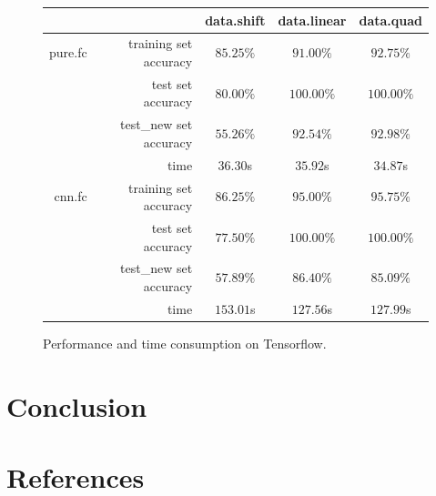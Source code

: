 \documentclass[a4paper]{article}
\begin{document}
\begin{figure}[H]
\centering
\begin{tabular}{|r|r|c|c|c|}
\hline
 & & data.shift & data.linear & data.quad \\
\hline
pure.fc & training set accuracy & $85.25\%$ & $91.00\%$ & $92.75\%$ \\
 & test set accuracy & $80.00\%$ & $100.00\%$ & $100.00\%$ \\
 & test\_new set accuracy & $55.26\%$ & $92.54\%$ & $92.98\%$ \\
 & time & $36.30$s & $35.92$s & $34.87$s \\
\hline
cnn.fc & training set accuracy & $86.25\%$ & $95.00\%$ & $95.75\%$ \\
 & test set accuracy & $77.50\%$ & $100.00\%$ & $100.00\%$ \\
 & test\_new set accuracy & $57.89\%$ & $86.40\%$ & $85.09\%$ \\
 & time & $153.01$s & $127.56$s & $127.99$s \\
\hline
\end{tabular}
\caption{Performance and time consumption on Tensorflow.}
\end{figure}

\section{Conclusion}

\section{References}



\end{document}
